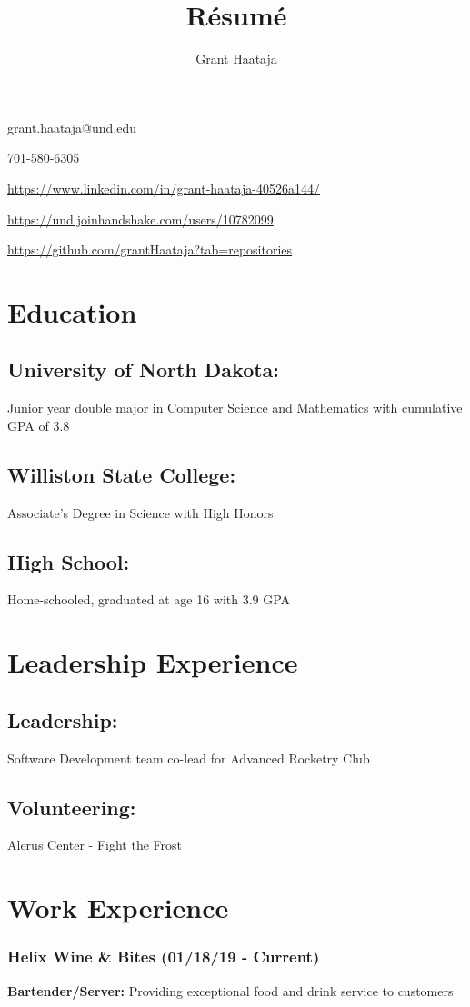 \documentclass{article}
\makeatletter
\renewcommand{\maketitle}{
\begin{center}
{\huge\bfseries
\theauthor}

\vspace{0.5em}

grant.haataja@und.edu

701-580-6305

\url{https://www.linkedin.com/in/grant-haataja-40526a144/}

\url{https://und.joinhandshake.com/users/10782099}

\url{https://github.com/grantHaataja?tab=repositories}

\end{center}
}
\makeatother
\begin{document}
\title{R\'esum\'e}
\author{Grant Haataja}
\maketitle

\section{Education}

\subsection{University of North Dakota:}
Junior year double major in Computer Science and Mathematics with cumulative GPA of 3.8

\subsection{Williston State College:}
Associate's Degree in Science with High Honors

\subsection{High School:}
Home-schooled, graduated at age 16 with 3.9 GPA

\section{Leadership Experience}

\subsection{Leadership:}
Software Development team co-lead for Advanced Rocketry Club

\subsection{Volunteering:}
Alerus Center - Fight the Frost 

\section{Work Experience}

\subsubsection{Helix Wine \& Bites (01/18/19 - Current)} 
\textbf{Bartender/Server:} Providing exceptional food and drink service to customers
\end{document}
